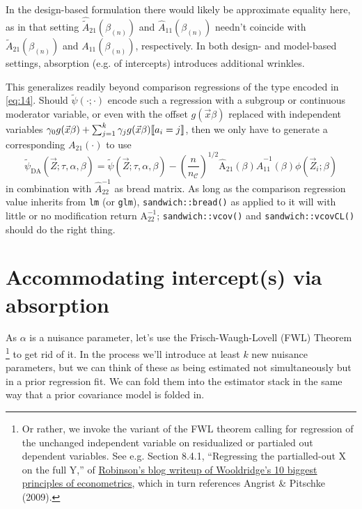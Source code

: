 \documentclass{article}
\DeclarePairedDelimiter{\indicator}{\llbracket}{\rrbracket}
\begin{document}
In the design-based formulation there
would likely be approximate equality here, as in that setting
$\hat{\tilde{A}}_{21}(\beta_{(n)})$ and $\hat{A}_{11}(\beta_{(n)})$ needn't
coincide with $\tilde{A}_{21}(\beta_{(n)})$ and ${A}_{11}(\beta_{(n)})$, respectively.  In both design- and model-based settings, absorption (e.g. of intercepts) introduces additional wrinkles.

This generalizes readily beyond comparison regressions of the type encoded in \eqref{eq:14}. Should $\tilde{\psi}(\cdot; \cdot)$ encode such a regression with a subgroup or continuous moderator variable, or even with the offset $g(\vec{x}\beta)$ replaced with independent variables $\gamma_{0}g(\vec{x}\beta) + \sum_{j=1}^{k}\gamma_{j} g(\vec{x}\beta)\indicator{a_{i}=j}$, then we only have to generate a corresponding ${A}_{21}(\cdot)$ to use
\begin{equation*}
      \tilde{\psi}_\text{DA}(\vec{Z}; \tau, \alpha, 
    \beta) = \tilde{\psi} (\vec{Z}; \tau,\alpha, 
    \beta) -
    \left(\frac{n}{n_{\mathcal{C}}}\right)^{1/2}
    \hat{\mathrm{A}}_{21}(\beta) \hat{A}_{11}^{-1}(\beta)\phi(\vec{Z}_{i};
    \beta)
\end{equation*}
in combination with $\hat{A}_{22}^{-1}$ as bread matrix. As long as the comparison regression value inherits from \texttt{lm} (or \texttt{glm}), \texttt{sandwich::bread()} as applied to it will with little or no modification return
$\mathrm{A}_{22}^{-1}$; \texttt{sandwich::vcov()} and \texttt{sandwich::vcovCL()} should do the right thing. 


\section{Accommodating intercept(s) via absorption}\label{sec:accomm-interc-via}
As $\alpha$ is a nuisance parameter, let's use the
Frisch-Waugh-Lovell (FWL) Theorem%
\footnote{Or rather, we invoke the variant of the FWL theorem calling
  for regression of the unchanged independent variable on residualized
or partialed out dependent variables.  See e.g. Section 8.4.1,
``Regressing the partialled-out X on the full Y,'' of
\href{https://bookdown.org/ts_robinson1994/10_fundamental_theorems_for_econometrics/frisch.html}{Robinson's
  blog writeup of Wooldridge's 10 biggest principles of econometrics},
which in turn references Angrist \& Pitschke (2009).} to get rid of it.  In the process we'll
introduce at least $k$ new nuisance parameters, but we can think of these as
being estimated not simultaneously but in a prior regression fit.
We can fold them into the estimator stack in the same way that a prior
covariance model is folded in.
\end{document}
